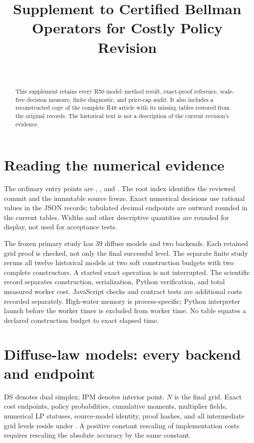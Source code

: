 
\begin{frontmatter}
\title{Supplement to Certified Bellman Operators for Costly Policy Revision}
\begin{aug}\author[id=au1,addressref={add1}]{~}\address[id=add1]{}\end{aug}
\begin{abstract}This supplement retains every R50 model--method result, exact-proof reference, scale-free decision measure, finite diagnostic, and price-cap audit. It also includes a reconstructed copy of the complete R48 article with its missing tables restored from the original records. The historical text is not a description of the current revision's evidence.\end{abstract}
\end{frontmatter}
\section{Reading the numerical evidence}
The ordinary entry points are , , and . The root index  identifies the reviewed commit and the immutable source freeze. Exact numerical decisions use rational values in the JSON records; tabulated decimal endpoints are outward rounded in the current tables. Widths and other descriptive quantities are rounded for display, not used for acceptance tests.

The frozen primary study has 39 diffuse models and two backends. Each retained grid proof is checked, not only the final successful level. The separate finite study reruns all twelve historical models at two soft construction budgets with two complete constructors. A started exact operation is not interrupted. The scientific record separates construction, serialization, Python verification, and total measured worker cost. JavaScript checks and contract tests are additional costs recorded separately. High-water memory is process-specific; Python interpreter launch before the worker timer is excluded from worker time. No table equates a declared construction budget to exact elapsed time.

\section{Diffuse-law models: every backend and endpoint}
DS denotes dual simplex; IPM denotes interior point. $N$ is the final grid. Exact cost endpoints, policy probabilities, cumulative moments, multiplier fields, numerical LP statuses, source-model identity, proof hashes, and all intermediate grid levels reside under . A positive constant rescaling of implementation costs requires rescaling the absolute accuracy by the same constant.

